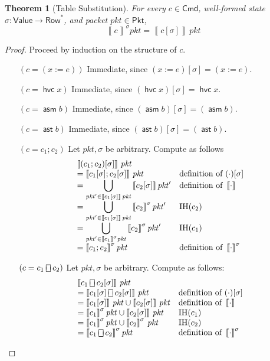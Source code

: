 \documentclass{article}
\newcommand{\pkt}{\mathit{pkt}}
\newcommand{\denote}[1]{\left\llbracket#1\right\rrbracket}
\newcommand{\Value}{\mathsf{Value}}
\newcommand{\Cmd}{\mathsf{Cmd}}
\newcommand{\Pkt}{\mathsf{Pkt}}
\newcommand{\Row}{\mathsf{Row}}
\newcommand{\assert}{\mathop{\mathsf{ast}}}
\newcommand{\assume}{\mathop{\mathsf{asm}}}
\newcommand{\choiceop}{\rotatebox[origin=c]{90}{$\sqsubset\!\!\!\sqsupset$}}
\newcommand{\choice}{\mathbin{\choiceop}}
\newcommand{\havoc}[1]{\mathop{\mathsf{hvc}}#1}
\newtheorem{theorem}{Theorem}
\begin{document}
\begin{theorem}[Table Substitution]
  \label{thm:subst}
  For every $c \in \Cmd$, well-formed state $\sigma : \Value \to \Row^*$, and
  packet $\pkt \in \Pkt$,
  \[\denote{c}^\sigma\pkt = \denote{c[\sigma]}\,\pkt\]
\end{theorem}
\begin{proof}
   Proceed by induction on the structure of $c$.
  \begin{enumerate}[align=left]
    \item[$(c = (x := e))$] Immediate, since $(x:=e)[\sigma] = (x:=e)$.

    \item[$(c = \havoc x)$] Immediate, since $(\havoc x)[\sigma] = \havoc x$.

    \item[$(c = \assume b)$] Immediate, since $(\assume b)[\sigma] = (\assume b)$.

    \item[$(c = \assert b)$] Immediate, since $(\assert b)[\sigma] = (\assert b)$.


    \item[$(c = c_1;c_2)$] Let $\pkt,\sigma$ be arbitrary. Compute as follows
      \[\begin{array}{ >{\displaystyle}l l}
        \denote{(c_1;c_2)[\sigma]}\,\pkt \\
        = \denote{c_1[\sigma];c_2[\sigma]}\,\pkt  & \text{definition of } (\cdot)[\sigma]\\
        = \bigcup_{\pkt' \in \denote{c_1[\sigma]}\,\pkt} \denote{c_2[\sigma]}\pkt' & \text{definition of } \denote{\cdot}\\
        = \bigcup_{\pkt' \in \denote{c_1[\sigma]}\,\pkt} \denote{c_2}^\sigma\pkt' & \text{IH}(c_2) \\
        = \bigcup_{\pkt' \in \denote{c_1}^\sigma\pkt} \denote{c_2}^\sigma\pkt' & \text{IH}(c_1) \\
        = \denote{c_1;c_2}^\sigma\pkt & \text{definition of } \denote{\cdot}^\sigma
      \end{array}\]

    \item[$(c = c_1 \choice c_2)$] Let $\pkt, \sigma$ be arbitrary. Compute as follows:
      \[ \begin{array}{>{\displaystyle}ll}
          \denote{c_1\choice c_2[\sigma]}\,\pkt\\
          = \denote{c_1[\sigma] \choice c_2[\sigma]}\,\pkt & \text{definition of } (\cdot)[\sigma]\\
          = \denote{c_1[\sigma]}\,\pkt \cup \denote{c_2[\sigma]}\,\pkt & \text{definition of } \denote{\cdot}\\
          = \denote{c_1}^\sigma\pkt \cup \denote{c_2[\sigma]}\,\pkt & \text{IH}(c_1)\\
          = \denote{c_1}^\sigma\pkt \cup \denote{c_2}^\sigma\,\pkt & \text{IH}(c_2)\\
          = \denote{c_1\choice c_2}^\sigma\pkt & \text{definition of } \denote{\cdot}^\sigma
          \end{array}
      \]


\end{enumerate}
\end{proof}
\end{document}
